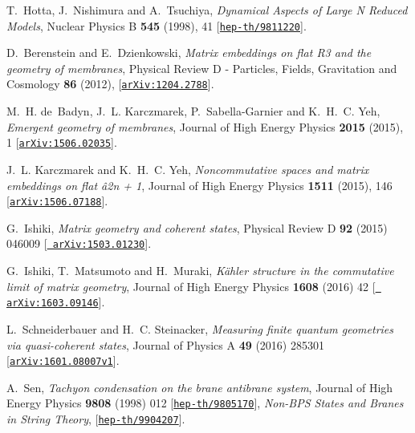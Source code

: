 \documentclass[12pt]{article}
\numberwithin{equation}{section}
\begin{document}
\begin{thebibliography}{10}
T.~Hotta, J.~Nishimura and A.~Tsuchiya, {\it {Dynamical Aspects of Large N
  Reduced Models}},  { Nuclear Physics B} {\bf 545} (1998), 41
  [\href{http://arXiv.org/abs/9811220}{{\tt hep-th/9811220}}].

D.~Berenstein and E.~Dzienkowski, {\it {Matrix embeddings on flat R3 and the
  geometry of membranes}},  { Physical Review D - Particles, Fields,
  Gravitation and Cosmology} {\bf 86} (2012), 
  [\href{http://arXiv.org/abs/1204.2788}{{\tt arXiv:1204.2788}}].

M.~H. de~Badyn, J.~L. Karczmarek, P.~Sabella-Garnier and K.~H.~C. Yeh, {\it
  {Emergent geometry of membranes}},  { Journal of High Energy Physics} {\bf
  2015} (2015), 1
  [\href{http://arXiv.org/abs/arXiv:1506.02035v1}{{\tt arXiv:1506.02035}}].

J.~L. Karczmarek and K.~H.~C. Yeh, {\it {Noncommutative spaces and matrix
  embeddings on flat ^^e2^^84^^9d2n + 1}},  { Journal of High Energy
  Physics} {\bf 1511} (2015), 146
  [\href{http://arXiv.org/abs/1506.07188}{{\tt arXiv:1506.07188}}].

G.~Ishiki, {\it {Matrix geometry and coherent states}},  { Physical Review
  D} {\bf 92} (2015) 046009 [\href{http://arXiv.org/abs/1503.01230}{{\tt
  arXiv:1503.01230}}].

G.~Ishiki, T.~Matsumoto and H.~Muraki, {\it {K{\"{a}}hler structure in the
  commutative limit of matrix geometry}},  { Journal of High Energy Physics}
  {\bf 1608} (2016) 42 [\href{http://arXiv.org/abs/1603.09146}{{\tt
  arXiv:1603.09146}}].

L.~Schneiderbauer and H.~C. Steinacker, {\it {Measuring finite quantum
  geometries via quasi-coherent states}},  { Journal of Physics A} {\bf 49} (2016) 285301
  [\href{http://arXiv.org/abs/arXiv:1601.08007v1}{{\tt arXiv:1601.08007v1}}].


A.~Sen, {\it {Tachyon condensation on the brane antibrane system}},  {
  Journal of High Energy Physics} {\bf 9808} (1998) 012
  [\href{http://arXiv.org/abs/9805170}{{\tt hep-th/9805170}}],
{{\it {Non-BPS States and Branes in
String Theory}}, [\href{http://arXiv.org/abs/9904207}{{\tt hep-th/9904207}}].}


\end{thebibliography}
\end{document}
